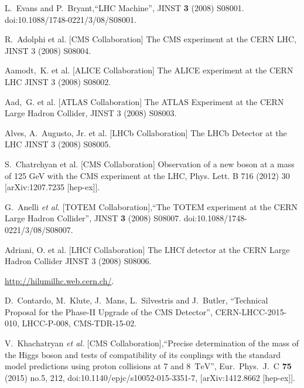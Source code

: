 \begin{thebibliography}{1}


 L.~Evans and P.~Bryant,``LHC Machine'',  JINST {\bf 3} (2008) S08001.  doi:10.1088/1748-0221/3/08/S08001.
  
 R.~Adolphi et al. [CMS Collaboration] The CMS experiment at the CERN LHC,
JINST 3 (2008) S08004.

 Aamodt,~K. et al. [ALICE Collaboration] The ALICE experiment at the CERN
LHC JINST 3 (2008) S08002.

Aad,~G. et al. [ATLAS Collaboration] The ATLAS Experiment at the CERN Large
Hadron Collider, JINST 3 (2008) S08003. 

Alves, A.~Augusto, Jr. et al. [LHCb Collaboration] The LHCb Detector at the LHC
JINST 3 (2008) S08005.

 S.~Chatrchyan et al. [CMS Collaboration] Observation of a new boson at a mass of 125 GeV with the CMS experiment at the LHC, Phys. Lett. B 716 (2012) 30 [arXiv:1207.7235 [hep-ex]].

 G.~Anelli {\it et al.} [TOTEM Collaboration],``The TOTEM experiment at the CERN Large Hadron Collider'', JINST {\bf 3} (2008) S08007. doi:10.1088/1748-0221/3/08/S08007.

Adriani, O. et al. [LHCf Collaboration] The LHCf detector at the CERN Large
Hadron Collider JINST 3 (2008) S08006.

 \url{http://hilumilhc.web.cern.ch/}. 

 D.~Contardo, M.~Klute, J.~Mans, L.~Silvestris and J.~Butler, ``Technical Proposal for the Phase-II Upgrade of the CMS Detector'',  CERN-LHCC-2015-010, LHCC-P-008, CMS-TDR-15-02.

  V.~Khachatryan {\it et al.} [CMS Collaboration],``Precise determination of the mass of the Higgs boson and tests of compatibility of its couplings with the standard model predictions using proton collisions at 7 and 8 $\,\text {TeV}$'', Eur.\ Phys.\ J.\ C {\bf 75} (2015) no.5,  212,
  doi:10.1140/epjc/s10052-015-3351-7, [arXiv:1412.8662 [hep-ex]].


\end{thebibliography}
